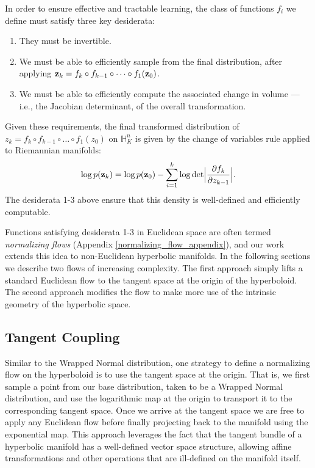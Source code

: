 In order to ensure effective and tractable learning, the class of functions $f_i$ we define must satisfy three key desiderata:
\begin{enumerate}[itemsep=0pt, parsep=0pt, topsep=0pt]
    \item They must be invertible. 
    \item We must be able to efficiently sample from the final distribution, after applying $\mathbf{z}_k = f_k \circ f_{k-1} \circ \dots \circ f_1(\mathbf{z}_0)$. 
    \item We must be able to efficiently compute the associated change in volume ---i.e., the Jacobian determinant, of the overall transformation.
\end{enumerate}
 Given these requirements, the final transformed distribution of  $z_k = f_k \circ f_{k-1} \circ \dots \circ f_1(z_0)$ on $\mathbb{H}^n_K$ is given by the change of variables rule applied to Riemannian manifolds:
\begin{equation}
    \log p(\mathbf{z}_k) = \log p(\mathbf{z}_0) - \sum_{i=1}^k\log \textnormal{det}\Big|\frac{\partial f_k}{\partial z_{k-1}} \Big|.
\end{equation}
The desiderata 1-3 above ensure that this density is well-defined and efficiently computable. 

Functions satisfying desiderata 1-3 in Euclidean space are often termed {\em normalizing flows} (Appendix \ref{normalizing_flow_appendix}), and our work extends this idea to non-Euclidean hyperbolic manifolds. In the following sections we describe two flows of increasing complexity. The first approach simply lifts a standard Euclidean flow to the tangent space at the origin of the hyperboloid.
The second approach modifies the flow to make more use of the intrinsic geometry of the hyperbolic space.

\subsection{Tangent Coupling}
Similar to the Wrapped Normal distribution, one strategy to define a normalizing flow on the hyperboloid is to use the tangent space at the origin. 
That is, we first sample a point from our base distribution, taken to be a Wrapped Normal distribution, and use the logarithmic map at the origin to transport it to the corresponding tangent space. Once we arrive at the tangent space we are free to apply any Euclidean flow before finally projecting back to the manifold using the exponential map. 
This approach leverages the fact that the tangent bundle of a hyperbolic manifold has a well-defined vector space structure, allowing affine transformations and other operations that are ill-defined on the manifold itself. 

